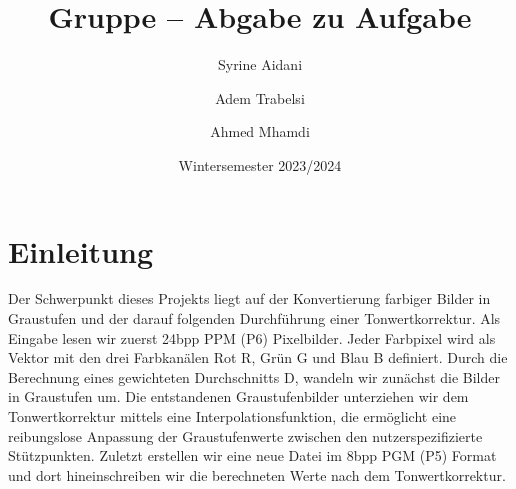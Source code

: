\documentclass[course=erap]{aspdoc}
\author{Syrine Aidani \and Adem Trabelsi \and Ahmed Mhamdi}
\date{Wintersemester 2023/2024}
\title{Gruppe \theGroup{} -- Abgabe zu Aufgabe \theNumber}
\begin{document}
\maketitle

\section{Einleitung}
Der Schwerpunkt dieses Projekts liegt auf der Konvertierung farbiger Bilder in Graustufen und der darauf folgenden Durchführung einer Tonwertkorrektur. 
Als Eingabe lesen wir zuerst 24bpp PPM (P6) Pixelbilder. Jeder Farbpixel wird als Vektor mit den drei Farbkanälen Rot R, Grün G und Blau B definiert. Durch die Berechnung eines gewichteten Durchschnitts D, wandeln wir zunächst die Bilder in Graustufen um. Die entstandenen Graustufenbilder unterziehen wir dem Tonwertkorrektur mittels eine Interpolationsfunktion, die ermöglicht eine reibungslose Anpassung der Graustufenwerte zwischen den nutzerspezifizierte Stützpunkten. 
Zuletzt erstellen wir eine neue Datei im 8bpp PGM (P5) Format und dort hineinschreiben wir die berechneten Werte nach dem Tonwertkorrektur.
\end{document}
